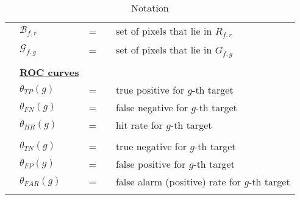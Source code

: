 \documentclass{article}
\begin{document}
\begin{longtable}{llllp{3in}}
&$\mathcal{B}_{f,r}$ 		&=&& set of pixels that lie in $R_{f,r}$\\
&$\mathcal{G}_{f,g}$ 	&=&& set of pixels that lie in $G_{f,g}$\\ \\

&\textbf{\underline{ROC curves}}&&&	\\
&$\theta_{TP}(g)$ 		&=&& true positive for $g$-th target\\
&$\theta_{FN}(g)$ 		&=&& false negative for $g$-th target\\ 
&$\theta_{HR}(g)$ 		&=&& hit rate for $g$-th target\\ \\

&$\theta_{TN}(g)$ 		&=&& true negative for $g$-th target\\
&$\theta_{FP}(g)$ 		&=&& false positive for $g$-th target\\
&$\theta_{FAR}(g)$ 		&=&& false alarm (positive) rate for $g$-th target\\

\caption{Notation}
\label{tab:notation}
\end{longtable}
\end{document}
